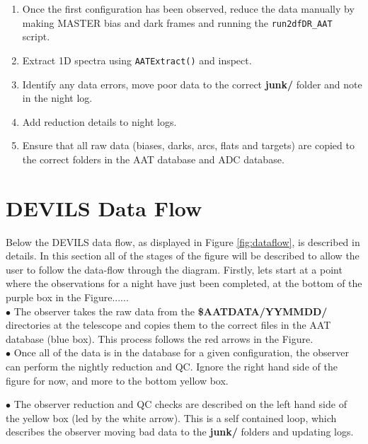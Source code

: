 \documentclass[12pt]{article}
\begin{document}
\begin{enumerate}
\item Once the first configuration has been observed, reduce the data manually by making MASTER bias and dark frames and running the \texttt{run2dfDR\_AAT} script.   

\item Extract 1D spectra using \texttt{AATExtract()} and inspect.

\item Identify any data errors, move poor data to the correct \textbf{junk/} folder and note in the night log.

\item Add reduction details to night logs.

\item Ensure that all raw data (biases, darks, arcs, flats and targets) are copied to the correct folders in the AAT database and ADC database.

\end{enumerate}

\section{DEVILS Data Flow}
\label{sec:dataflow}

Below the DEVILS data flow, as displayed in Figure \ref{fig:dataflow}, is described in details. In this section all of the stages of the figure will be described to allow the user to follow the data-flow through the diagram. Firstly, lets start at a point where the observations for a night have just been completed, at the bottom of the purple box in the Figure...... \\

$\bullet$ The observer takes the raw data from the \textbf{\$AATDATA/YYMMDD/} directories at the telescope and copies them to the correct files in the AAT database (blue box). This process follows the red arrows in the Figure. \\

$\bullet$ Once all of the data is in the database for a given configuration, the observer can perform the nightly reduction and QC. Ignore the right hand side of the figure for now, and more to the bottom yellow box.

$\bullet$ The observer reduction and QC checks are described on the left hand side of the yellow box (led by the white arrow). This is a self contained loop, which describes the observer moving bad data to the \textbf{junk/} folders and updating logs.\\
\end{document}
